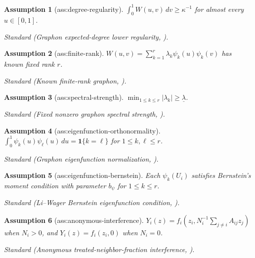 \documentclass{article}
\newtheorem{assumption}{Assumption}
\begin{document}
\begin{assumption}[ass:degree-regularity]\label{ass:degree-regularity}
\(\int_0^1W(u,v)\,dv\ge\kappa^{-1}\) for almost every \(u\in[0,1]\).
\par\smallskip\noindent\emph{Standard} (Graphon expected-degree lower regularity, \cite{LiWager2022RandomGraph}).
\end{assumption}

\begin{assumption}[ass:finite-rank]\label{ass:finite-rank}
\(W(u,v)=\sum_{k=1}^r\lambda_k\psi_k(u)\psi_k(v)\) has known fixed rank \(r\).
\par\smallskip\noindent\emph{Standard} (Known finite-rank graphon, \cite{LiWager2022RandomGraph}).
\end{assumption}

\begin{assumption}[ass:spectral-strength]\label{ass:spectral-strength}
\(\min_{1\le k\le r}|\lambda_k|\ge\underline\lambda\).
\par\smallskip\noindent\emph{Standard} (Fixed nonzero graphon spectral strength, \cite{LiWager2022RandomGraph}).
\end{assumption}

\begin{assumption}[ass:eigenfunction-orthonormality]\label{ass:eigenfunction-orthonormality}
\(\int_0^1\psi_k(u)\psi_\ell(u)\,du=\mathbf 1\{k=\ell\}\) for \(1\le k,\ell\le r\).
\par\smallskip\noindent\emph{Standard} (Graphon eigenfunction normalization, \cite{LiWager2022RandomGraph}).
\end{assumption}

\begin{assumption}[ass:eigenfunction-bernstein]\label{ass:eigenfunction-bernstein}
Each \(\psi_k(U_i)\) satisfies Bernstein's moment condition with parameter \(b_\psi\) for \(1\le k\le r\).
\par\smallskip\noindent\emph{Standard} (Li--Wager Bernstein eigenfunction condition, \cite{LiWager2022RandomGraph}).
\end{assumption}

\begin{assumption}[ass:anonymous-interference]\label{ass:anonymous-interference}
\(Y_i(z)=f_i\!\left(z_i,N_i^{-1}\sum_{j\ne i}A_{ij}z_j\right)\) when \(N_i>0\), and \(Y_i(z)=f_i(z_i,0)\) when \(N_i=0\).
\par\smallskip\noindent\emph{Standard} (Anonymous treated-neighbor-fraction interference, \cite{LiWager2022RandomGraph}).
\end{assumption}
\end{document}
